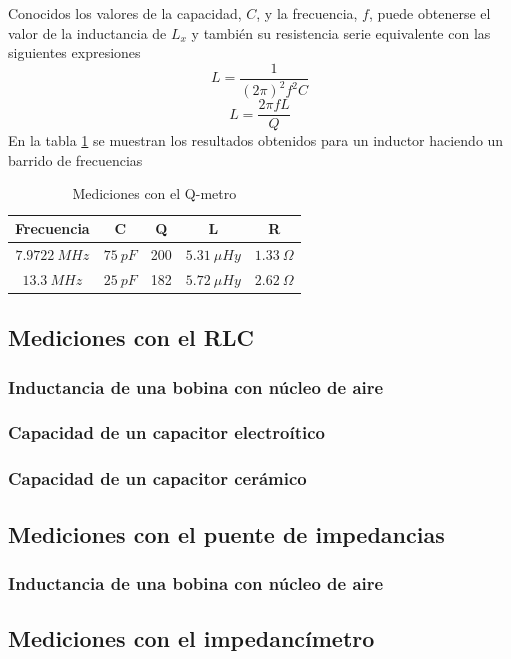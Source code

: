 \documentclass[a4paper,10pt]{article}
\begin{document}
		Conocidos los valores de la capacidad, $C$, y la frecuencia, $f$, puede obtenerse el valor de la inductancia de $L_x$ y tambi\'en su resistencia serie equivalente con las siguientes expresiones
		$$L=\frac{1}{(2\pi)^2 f^2C}$$
		$$L=\frac{2\pi fL}{Q}$$
		En la tabla \ref{tab001} se muestran los resultados obtenidos para un inductor haciendo un barrido de frecuencias
		
		\begin{table}[!htp]
					\centering
					\begin{tabular}{|c|c|c|c|c|}
						\hline
			    		Frecuencia & C & Q & L & R \\
						\hline
						$7.9722~MHz$& $75~pF$& 200 & $5.31~\mu Hy$ &$ 1.33~\Omega$ \\
						\hline
						$13.3~MHz$& $25~pF$& 182 & $5.72~\mu Hy$ &$ 2.62~\Omega$ \\
						\hline  
					\end{tabular}
					\caption{Mediciones con el Q-metro} \label{tab001}
				\end{table}
		\subsection{Mediciones con el RLC}		
		
		\subsubsection{Inductancia de una bobina con n\'ucleo de aire}
		\subsubsection{Capacidad de un capacitor electro\'itico}	
		\subsubsection{Capacidad de un capacitor cer\'amico}
		
		\subsection{Mediciones con el puente de impedancias}
	
		\subsubsection{Inductancia de una bobina con n\'ucleo de aire}
		
		\subsection{Mediciones con el impedanc\'imetro}
		
\end{document}
